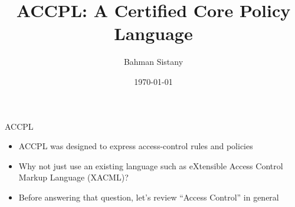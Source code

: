 \documentclass{beamer}
\title{ACCPL: A Certified Core Policy Language}
\author{Bahman Sistany}
\date{\today}
\begin{document}
\begin{frame}
\titlepage
\end{frame}

\begin{frame}{ACCPL}
\begin{itemize}
   \item ACCPL was designed to express access-control rules and policies
   \item Why not just use an existing language such as eXtensible Access Control Markup Language (XACML)? 
   \item Before answering that question, let's review ``Access Control'' in general
\end{itemize}
\end{frame}

\end{document}
